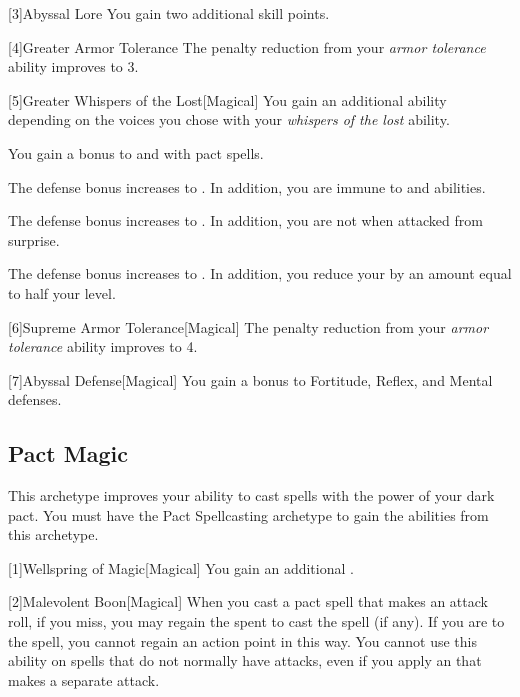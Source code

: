         [3]{Abyssal Lore} You gain two additional skill points.

        [4]{Greater Armor Tolerance} The penalty reduction from your \textit{armor tolerance} ability improves to 3.

        [5]{Greater Whispers of the Lost}[Magical] You gain an additional ability depending on the voices you chose with your \textit{whispers of the lost} ability.
        {
             You gain a  bonus to  and  with pact spells.

             The defense bonus increases to .
            In addition, you are immune to  and  abilities.

             The defense bonus increases to .
            In addition, you are not  when attacked from surprise.

             The defense bonus increases to .
            In addition, you reduce your  by an amount equal to half your level.
        }

        [6]{Supreme Armor Tolerance}[Magical] The penalty reduction from your \textit{armor tolerance} ability improves to 4.

        [7]{Abyssal Defense}[Magical] You gain a  bonus to Fortitude, Reflex, and Mental defenses.

    \subsection{Pact Magic}
        This archetype improves your ability to cast spells with the power of your dark pact.
        You must have the Pact Spellcasting archetype to gain the abilities from this archetype.

        [1]{Wellspring of Magic}[Magical] You gain an additional .

        [2]{Malevolent Boon}[Magical]
        When you cast a pact spell that makes an attack roll, if you miss, you may regain the  spent to cast the spell (if any).
        If you are  to the spell, you cannot regain an action point in this way.
        You cannot use this ability on spells that do not normally have attacks, even if you apply an  that makes a separate attack.

